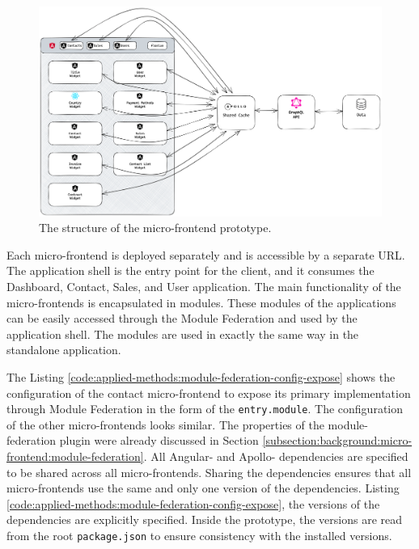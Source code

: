 \ifshowImages
\begin{figure}[H]
  \centering
  \includegraphics[width=1\linewidth]{images/applied-methods/prototypical-implementation/host-architecture.png}
  \caption{The structure of the micro-frontend prototype.}\label{fig:applied-methods:prototype-micro-frontend-architecture}
\end{figure}
\fi

\noindent Each micro-frontend is deployed separately and is accessible by a separate \ac{URL}. The application shell is the entry point for the client, and it consumes the Dashboard, Contact, Sales, and User application. The main functionality of the micro-frontends is encapsulated in modules. These modules of the applications can be easily accessed through the Module Federation and used by the application shell. The modules are used in exactly the same way in the standalone application.

\bigskip

\noindent The Listing \ref{code:applied-methods:module-federation-config-expose} shows the configuration of the contact micro-frontend to expose its primary implementation through Module Federation in the form of the \texttt{entry.module}. The configuration of the other micro-frontends looks similar. The properties of the module-federation plugin were already discussed in Section \ref{subsection:background:micro-frontend:module-federation}. All Angular- and Apollo- dependencies are specified to be shared across all micro-frontends. Sharing the dependencies ensures that all micro-frontends use the same and only one version of the dependencies. Listing \ref{code:applied-methods:module-federation-config-expose}, the versions of the dependencies are explicitly specified. Inside the prototype, the versions are read from the root \texttt{package.json} to ensure consistency with the installed versions.

